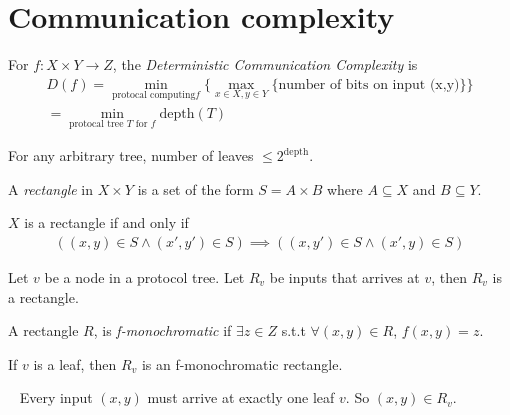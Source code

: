 \setcounter{chapter}{1}
\chapter{Communication complexity}


\begin{definition}
For $f: X \times Y \to Z$, the \textit{Deterministic Communication Complexity} is
\begin{align*}
    D(f) = \min_{\text{protocal computing} f} \{ \max_{x \in X, y \in Y} \{ \text{number of bits on input (x,y)} \} \}
    \\ = \min_{\text{protocal tree } T \text{ for } f} \text{depth}(T)
 \end{align*}
\end{definition}

\begin{observe}
    For any arbitrary tree, number of leaves $\le 2^{\text{depth}}$.
\end{observe}

\begin{definition}[Rectangle]
A \textit{rectangle} in $X \times Y$ is a set of the form $S = A \times B$ where $A \subseteq X$ and $B \subseteq Y$.
\end{definition}

\begin{observe}
    $X$ is a rectangle if and only if
    \begin{align*}
        \left( (x,y) \in S \land (x',y')\in S \right) \implies \left( (x,y') \in S \land (x',y)\in S \right)
    \end{align*}
\end{observe}

\begin{remark}
Let $v$ be a node in a protocol tree. Let $R_v$ be inputs that arrives at $v$, then $R_v$ is a rectangle.
\end{remark}

\begin{definition}[f-monochromatic]
A rectangle $R$, is \textit{f-monochromatic} if $\exists z \in Z$ s.t.t $\forall (x,y) \in R$, $f(x,y)=z$.
\end{definition}

\begin{remark}
If $v$ is a leaf, then $R_v$ is an f-monochromatic rectangle.
\end{remark}

\begin{remark} ~
Every input $(x,y)$ must arrive at exactly one leaf $v$. So $(x,y)\in R_v$. 
\end{remark}

